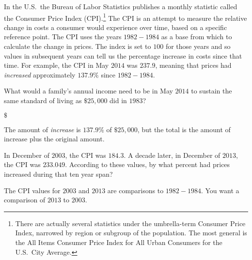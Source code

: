 \documentclass{ximera}
\begin{document}
In the U.S.\ the Bureau of Labor Statistics publishes a monthly statistic called the Consumer Price Index (CPI).\footnote{There are actually several statistics under the umbrella-term Consumer Price Index, narrowed by region or subgroup of the population. The most general is the All Items Consumer Price Index for All Urban Consumers for the U.S.\ City Average. } The CPI is an attempt to measure the relative change in costs a consumer would experience over time, based on a specific reference point. The CPI uses the years $1982-1984$ as a base from which to calculate the change in prices. The index is set to $100$ for those years and so values in subsequent years can tell us the percentage increase in costs since that time. For example, the CPI in May $2014$ was $237.9$, meaning that prices had \emph{increased} approximately $137.9\%$ since $1982-1984$.

\begin{question}
What would a family's annual income need to be in May $2014$ to sustain the same standard of living as $\$25,000$ did in $1983$?
\begin{solution}
$\$$
\end{solution}
\begin{hint}
The amount of \emph{increase} is $137.9\%$ of $\$25,000$, but the total is the amount of increase plus the original amount.
\end{hint}	
\end{question}

\begin{question}
In December of $2003$, the CPI was $184.3$. A decade later, in December of $2013$, the CPI was $233.049$. According to these values, by what percent had prices increased during that ten year span?
\begin{solution}
\begin{multiple-choice}
\end{multiple-choice}
\end{solution}
\begin{hint}
The CPI values for $2003$ and $2013$ are comparisons to $1982-1984$. You want a comparison of $2013$ to $2003$.
\end{hint}
\end{question}
\end{document}
